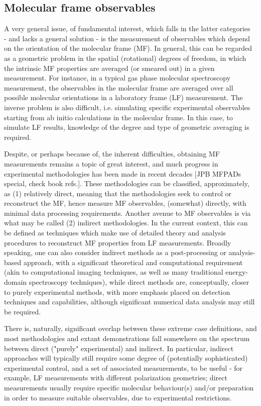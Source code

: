 \subsection{Molecular frame observables}

A very general issue, of fundamental interest, which falls in the latter categories  - and lacks a general solution - is the measurement of observables which depend on the orientation of the molecular frame (MF). In general, this can be regarded as a geometric problem in the spatial (rotational) degrees of freedom, in which the intrinsic MF properties are averaged (or smeared out) in a given measurement. For instance, in a typical gas phase molecular spectroscopy measurement, the observables in the molecular frame  are averaged over all possible molecular orientations in a laboratory frame (LF) measurement. The inverse problem is also difficult, i.e. simulating specific experimental observables starting from ab initio calculations in the molecular frame. In this case, to simulate LF results, knowledge of the degree and type of geometric averaging is required. 

Despite, or perhaps because of, the inherent difficulties, obtaining  MF measurements remains a topic of great interest, and much progress in experimental methodologies has been made in recent decades \cite{Reid2003,Becker1998,Reid2012, kleinpoppen2013perfect, Yagishita2015, hockett2018QuantumMetrologyPhotoelectrons} [JPB MFPADs special, check book refs.]. These methodologies can be classified, approximately, as (1) relatively direct, meaning that the methodologies seek to control or reconstruct the MF, hence measure MF observables, (somewhat) directly, with minimal data processing requirements. Another avenue to MF observables is via what may be called (2) indirect methodologies. In the current context, this can be defined as techniques which make use of detailed theory and analysis procedures to reconstruct MF properties from LF measurements. Broadly speaking, one can also consider indirect methods as a post-processing or analysis-based approach, with a significant theoretical and computational requirement (akin to computational imaging techniques, as well as many traditional energy-domain spectroscopy techniques), while direct methods are, conceptually, closer to purely experimental methods, with more emphasis placed on detection techniques and capabilities, although significant numerical data analysis may still be required. 

There is, naturally, significant overlap between these extreme case definitions, and most methodologies and extant demonstrations fall somewhere on the spectrum between direct ("purely" experimental) and indirect. In particular, indirect approaches will typically still require some degree of (potentially sophisticated) experimental control, and a set of associated measurements, to be useful - for example, LF measurements with different polarization geometries; direct measurements usually require specific molecular behaviour(s) and/or preparation in order to measure suitable observables, due to experimental restrictions.